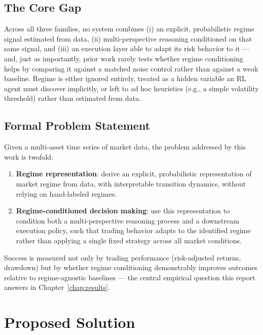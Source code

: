 \subsection{The Core Gap}
\label{subsec:core-gap}

Across all three families, no system combines (i) an explicit, probabilistic regime signal estimated from data, (ii) multi-perspective reasoning conditioned on that same signal, and (iii) an execution layer able to adapt its risk behavior to it --- and, just as importantly, prior work rarely tests whether regime conditioning helps by comparing it against a matched noise control rather than against a weak baseline. Regime is either ignored entirely, treated as a hidden variable an RL agent must discover implicitly, or left to ad hoc heuristics (e.g., a simple volatility threshold) rather than estimated from data.

\subsection{Formal Problem Statement}
\label{subsec:formal-problem}

Given a multi-asset time series of market data, the problem addressed by this work is twofold:

\begin{enumerate}
    \item \textbf{Regime representation}: derive an explicit, probabilistic representation of market regime from data, with interpretable transition dynamics, without relying on hand-labeled regimes.
    \item \textbf{Regime-conditioned decision making}: use this representation to condition both a multi-perspective reasoning process and a downstream execution policy, such that trading behavior adapts to the identified regime rather than applying a single fixed strategy across all market conditions.
\end{enumerate}

Success is measured not only by trading performance (risk-adjusted returns, drawdown) but by whether regime conditioning demonstrably improves outcomes relative to regime-agnostic baselines --- the central empirical question this report answers in Chapter~\ref{chap:results}.

\section{Proposed Solution}
\label{sec:proposed-solution}

